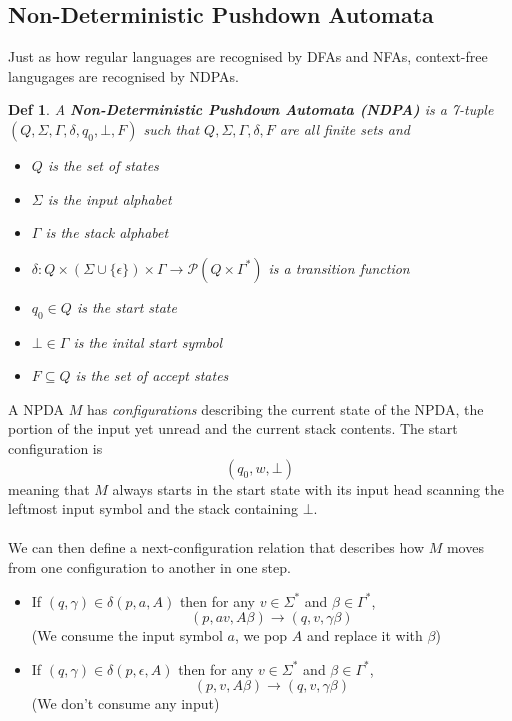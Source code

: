 \documentclass{article}
\newtheorem{defn}[dummy]{Def}
\begin{document}
    \subsection{Non-Deterministic Pushdown Automata}
        Just as how regular languages are recognised by DFAs and NFAs, context-free langugages are recognised by NDPAs. 
        \begin{defn}
            A \textbf{Non-Deterministic Pushdown Automata (NDPA)} is a 7-tuple $(Q,\Sigma, \Gamma, \delta, q_0, \bot, F)$ such that $Q,\Sigma, \Gamma, \delta, F$ are all finite sets and
            \begin{itemize}
                \item $Q$ is the set of states
                \item $\Sigma$ is the input alphabet
                \item $\Gamma$ is the stack alphabet
                \item $\delta : Q \times (\Sigma \cup \{ \epsilon \}) \times \Gamma \to \mathcal{P}(Q \times \Gamma^*)$ is a transition function
                \item $q_0 \in Q$ is the start state
                \item $\bot \in \Gamma$ is the inital start symbol
                \item $F \subseteq Q$ is the set of accept states
            \end{itemize}
        \end{defn}
        A NPDA $M$ has \textit{configurations} describing the current state of the NPDA, the portion of the input yet unread and the current stack contents. The start configuration is
        \[ (q_0, w, \bot) \]
        meaning that $M$ always starts in the start state with its input head scanning the leftmost input symbol and the stack containing $\bot$. \\ \\
        We can then define a next-configuration relation that describes how $M$ moves from one configuration to another in one step. 
        \begin{itemize}
            \item If $(q, \gamma) \in \delta(p, a, A)$ then for any $v \in \Sigma^*$ and $\beta \in \Gamma^*$,
            \[ (p, av, A\beta) \to (q,v,\gamma \beta) \]
            (We consume the input symbol $a$, we pop $A$ and replace it with $\beta$)
            \item If $(q, \gamma) \in \delta(p, \epsilon, A)$ then for any $v \in \Sigma^*$ and $\beta \in \Gamma^*$,
            \[ (p, v, A\beta) \to (q,v,\gamma \beta) \]
            (We don't consume any input)
        \end{itemize}
\end{document}
